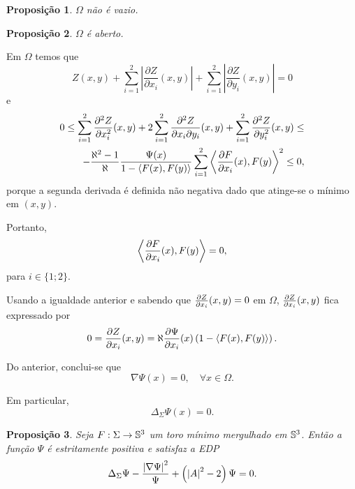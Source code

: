 \documentclass[12pt,a4paper]{beamer}
\newtheorem{proposicao}{Proposição}
\theoremstyle{definition}
\begin{document}
\begin{frame}[allowframebreaks]
	\begin{proposicao}
		$\Omega$ não é vazio.
	\end{proposicao}

	\begin{proposicao}
		$\Omega$ é aberto.
	\end{proposicao}

	Em $\Omega$ temos que
	\begin{equation*}
		Z(x,y) + \sum_{i=1}^{2} \left| \frac{\partial Z}{\partial x_i}(x,y) \right| + \sum_{i=1}^{2} \left| \frac{\partial Z}{\partial y_i}(x,y) \right| = 0
	\end{equation*}
	e
	\begin{align*}
		0 \leq \sum_{i=1}^{2} \frac{\partial^2 Z}{\partial x_i^2}(x,y) + 2 \sum_{i=1}^{2} \frac{\partial^2 Z}{\partial x_i \partial y_i}(x,y) + \sum_{i=1}^{2} \frac{\partial^2 Z}{\partial y_i^2}(x,y) \leq \\
		- \frac{\aleph^2 -1}{\aleph} \frac{\Psi(x)}{1 - \left\langle F(x),F(y) \right\rangle} \sum_{i=1}^{2} \left\langle \frac{\partial F}{\partial x_i}(x),F(y) \right\rangle^2 \leq 0,
	\end{align*}
	porque a segunda derivada é definida não negativa dado que atinge-se o mínimo em $(x,y)$.

	Portanto, 
	\begin{equation*}
		\left\langle \frac{\partial F}{\partial x_i}(x),F(y) \right\rangle = 0,
	\end{equation*}
	para $i \in \{1;2\}$.
	
	Usando a igualdade anterior e sabendo que $\frac{\partial Z}{\partial x_i}(x,y)=0$ em $\Omega$, $\frac{\partial Z}{\partial x_i}(x,y)$ fica expressado por
	\begin{equation*}
		0 = \frac{\partial Z}{\partial x_i}(x,y) = \aleph \frac{\partial \Psi}{\partial x_i}(x) \left( 1 - \left\langle F(x),F(y) \right\rangle \right).
	\end{equation*}

	Do anterior, conclui-se que
	\begin{equation*}
		\nabla \Psi(x) = 0, \quad \forall x \in \Omega.
	\end{equation*}
	
	Em particular,
	\begin{equation*}
		\Delta_{\Sigma} \Psi(x) = 0.
	\end{equation*}

	\begin{proposicao}
		Seja $F: \Sigma \rightarrow \mathbb{S}^3$ um toro mínimo mergulhado em $\mathbb{S}^3$. Então a função $\Psi$ é estritamente positiva e satisfaz a EDP
		\begin{equation*}
			\Delta_{\Sigma} \Psi - \frac{\left| \nabla \Psi \right|^2}{\Psi} + \left( \left| A \right|^2 - 2 \right) \Psi = 0.
		\end{equation*}
	\end{proposicao}


\end{frame}
\end{document}
